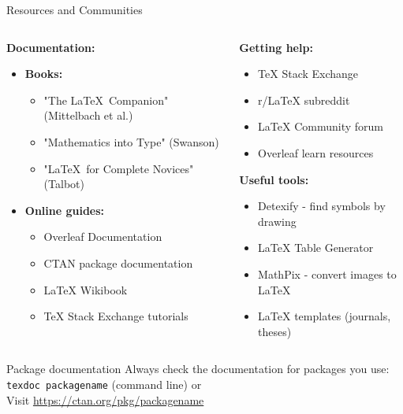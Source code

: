 	\begin{frame}{Resources and Communities}
		\begin{columns}
			\begin{column}{0.5\textwidth}
				\textbf{Documentation:}
				\begin{itemize}
					\item \textbf{Books:}
					\begin{itemize}
						\item "The \LaTeX\ Companion" (Mittelbach et al.)
						\item "Mathematics into Type" (Swanson)
						\item "\LaTeX\ for Complete Novices" (Talbot)
					\end{itemize}
					
					\item \textbf{Online guides:}
					\begin{itemize}
						\item Overleaf Documentation
						\item CTAN package documentation
						\item LaTeX Wikibook
						\item TeX Stack Exchange tutorials
					\end{itemize}
				\end{itemize}
			\end{column}
			
			\begin{column}{0.5\textwidth}
				\textbf{Getting help:}
				\begin{itemize}
					\item TeX Stack Exchange
					\item r/LaTeX subreddit
					\item LaTeX Community forum
					\item Overleaf learn resources
				\end{itemize}
				
				\textbf{Useful tools:}
				\begin{itemize}
					\item Detexify - find symbols by drawing
					\item LaTeX Table Generator
					\item MathPix - convert images to LaTeX
					\item LaTeX templates (journals, theses)
				\end{itemize}
			\end{column}
		\end{columns}
		
		\begin{block}{Package documentation}
			Always check the documentation for packages you use:\\
			\texttt{texdoc packagename} (command line) or\\
			Visit \url{https://ctan.org/pkg/packagename}
		\end{block}
	\end{frame}
	
